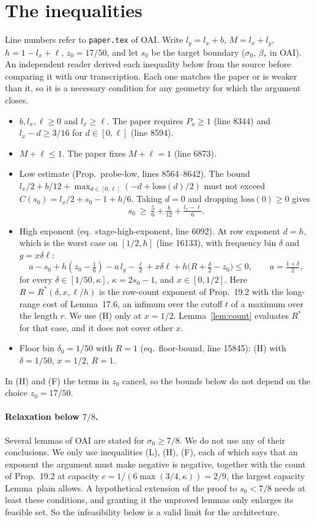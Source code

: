 \documentclass[11pt]{article}
\theoremstyle{remark}\newtheorem*{remark}{Remark}
\begin{document}
\section{The inequalities}
Line numbers refer to \texttt{paper.tex} of OAI. Write $l_y=l_x+b$, $M=l_x+l_y$, $h=1-l_x+\ell$,
$z_0=17/50$, and let $s_0$ be the target boundary ($\sigma_0$, $\beta_*$ in OAI). An independent reader
derived each inequality below from the source before comparing it with our transcription. Each one
matches the paper or is weaker than it, so it is a necessary condition for any geometry for which the
argument closes.
\begin{itemize}
\item[(N)] $b,l_x,\ell\ge0$ and $l_x\ge\ell$. The paper requires $P_a\ge1$ (line 8344) and
$l_x-d\ge3/16$ for $d\in[0,\ell]$ (line 8594).
\item[(S)] $M+\ell\le1$. The paper fixes $M+\ell=1$ (line 6873).
\item[(L)] Low estimate (Prop.~probe-low, lines 8564--8642). The bound
$l_x/2+b/12+\max_{d\in[0,\ell]}(-d+\mathrm{loss}(d)/2)$ must not exceed
$C(s_0)=l_x/2+s_0-1+h/6$. Taking $d=0$ and dropping $\mathrm{loss}(0)\ge0$ gives
\[ s_0\ \ge\ \tfrac56+\tfrac{b}{12}+\tfrac{l_x-\ell}{6}. \]
\item[(H)] High exponent (eq.~stage-high-exponent, line 6092). At row exponent $d=h$, which is the worst
case on $[1/2,h]$ (line 16133), with frequency bin $\delta$ and $g=x\delta\ell$:
\[ a-s_0+h(z_0-\tfrac16)-a\,l_y-\tfrac{\ell}{2}+x\delta\ell+h\bigl(R+\tfrac{\delta}{2}-z_0\bigr)\le0,
\qquad a=\tfrac{1+\delta}{2}, \]
for every $\delta\in[1/50,\kappa]$, $\kappa=2s_0-1$, and $x\in[0,1/2]$. Here
$R=R^*(\delta,x,\ell/h)$ is the row-count exponent of Prop.~19.2 with the long-range cost of
Lemma~17.6, an infimum over the cutoff $t$ of a maximum over the length $r$. We use (H) only at
$x=1/2$. Lemma~\ref{lem:count} evaluates $R^*$ for that case, and it does not cover other $x$.
\item[(F)] Floor bin $\delta_0=1/50$ with $R=1$ (eq.~floor-bound, line 15845): (H) with
$\delta=1/50$, $x=1/2$, $R=1$.
\end{itemize}
In (H) and (F) the terms in $z_0$ cancel, so the bounds below do not depend on the choice
$z_0=17/50$.

\paragraph{Relaxation below $7/8$.} Several lemmas of OAI are stated for $\sigma_0\ge7/8$. We do not
use any of their conclusions. We only use inequalities (L), (H), (F), each of which says that an
exponent the argument must make negative is negative, together with the count of Prop.~19.2 at
capacity $c=1/(6\max(3/4,\kappa))=2/9$, the largest capacity Lemma~plain allows. A hypothetical
extension of the proof to $s_0<7/8$ needs at least these conditions, and granting it the
unproved lemmas only enlarges its feasible set. So the infeasibility below is a valid limit for the
architecture.
\end{document}
